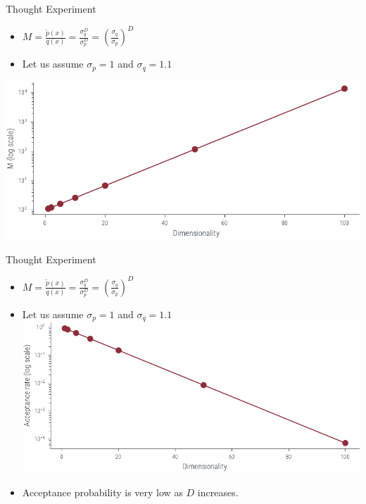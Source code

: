 \documentclass{beamer}
\begin{document}
\begin{frame}{Thought Experiment}
    \begin{itemize}
        \item $M = \frac{\tilde{p}(x)}{q(x)} = \frac{\sigma_q^D}{\sigma_p^D} = (\frac{\sigma_q}{\sigma_p})^D$
        \item Let us assume $\sigma_p = 1$ and $\sigma_q = 1.1$
    \end{itemize}
    \includegraphics[width=\textwidth]{../figures/sampling/rejection-sampling-gaussian-p-q-M.pdf}

    
\end{frame}
   
\begin{frame}{Thought Experiment}
    \begin{itemize}
        \item $M = \frac{\tilde{p}(x)}{q(x)} = \frac{\sigma_q^D}{\sigma_p^D} = (\frac{\sigma_q}{\sigma_p})^D$
        \item Let us assume $\sigma_p = 1$ and $\sigma_q = 1.1$
       \includegraphics[width=\textwidth]{../figures/sampling/rejection-sampling-gaussian-p-q-acceptance.pdf}
        \item Acceptance probability is very low as $D$ increases.
    \end{itemize}

    
\end{frame}
    
\end{document}
